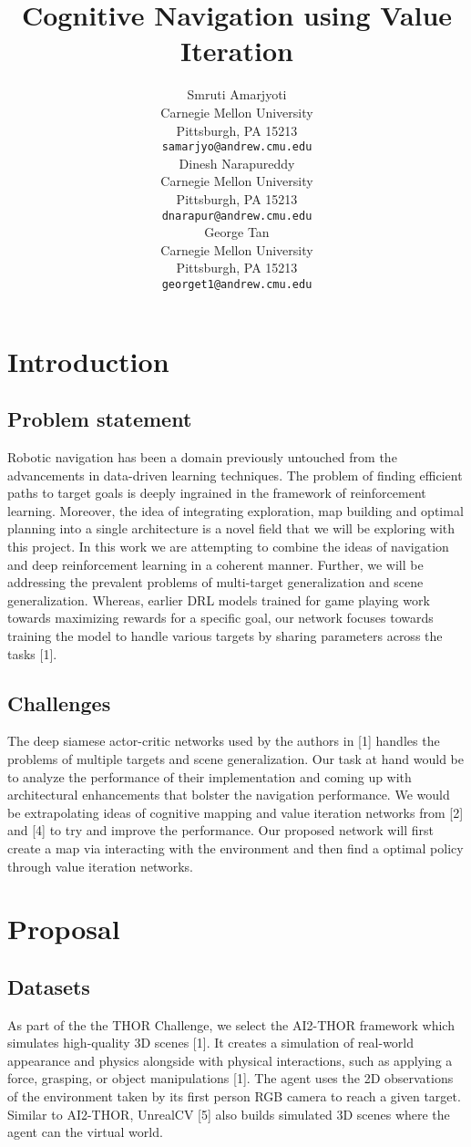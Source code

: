 \documentclass{article}
\title{Cognitive Navigation using Value Iteration}
\author{
  Smruti Amarjyoti \\
  Carnegie Mellon University\\
  Pittsburgh, PA 15213 \\
  \texttt{samarjyo@andrew.cmu.edu} \\
  \And
  Dinesh Narapureddy \\
  Carnegie Mellon University\\
  Pittsburgh, PA 15213 \\
  \texttt{dnarapur@andrew.cmu.edu} \\
  \And
  George Tan \\
  Carnegie Mellon University\\
  Pittsburgh, PA 15213 \\
  \texttt{georget1@andrew.cmu.edu} \\
}
\begin{document}
\maketitle

\section{Introduction}
\subsection{Problem statement}
Robotic navigation has been a domain previously untouched from the advancements in data-driven learning techniques. The problem of finding efficient paths to target goals is deeply ingrained in the framework of reinforcement learning. Moreover, the idea of integrating exploration, map building and optimal planning into a single architecture is a novel field that we will be exploring with this project. In this work we are attempting to combine the ideas of navigation and deep reinforcement learning in a coherent manner. Further, we will be addressing the prevalent problems of multi-target generalization and scene generalization. Whereas, earlier DRL models trained for game playing work towards maximizing rewards for a specific goal, our network focuses towards training the model to handle various targets by sharing parameters across the tasks [1].

\subsection{Challenges}
The deep siamese actor-critic networks used by the authors in [1] handles the problems of multiple targets and scene generalization. Our task at hand would be to analyze the performance of their implementation and coming up with architectural enhancements that bolster the navigation performance. We would be extrapolating ideas of cognitive mapping and value iteration networks from [2] and [4] to try and improve the performance. Our proposed network will first create a map via interacting with the environment and then find a optimal policy through value iteration networks.

\section{Proposal}
\subsection{Datasets}
As part of the the THOR Challenge, we select the AI2-THOR framework which simulates high-quality 3D scenes [1]. It creates a simulation of real-world appearance and physics alongside with physical interactions, such as applying a force, grasping, or object manipulations [1]. The agent uses the 2D observations of the environment taken by its first person RGB camera to reach a given target. Similar to AI2-THOR, UnrealCV [5] also builds simulated 3D scenes where the agent can the virtual world.
\end{document}

